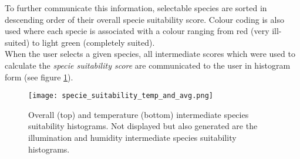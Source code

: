 To further communicate this information, selectable species are sorted in descending order of their overall specie suitability score. Colour coding is also used where each specie is associated with a colour ranging from red (very ill-suited) to light green (completely suited).\\

When the user selects a given species, all intermediate scores which were used to calculate the \textit{specie suitability score} are communicated to the user in histogram form (see figure \ref{fig:specie_intermediate_suitability_scores}).

\begin{figure}
\center
	\texttt{[image: specie\_suitability\_temp\_and\_avg.png]}
	\caption{ Overall (top) and temperature (bottom) intermediate species suitability histograms. Not displayed but also generated are the illumination and humidity intermediate species suitability histograms.}	
	\label{fig:specie_intermediate_suitability_scores}
\end{figure}


